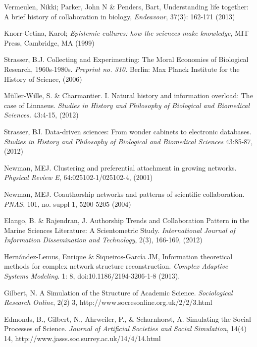 \begin{thebibliography}{50}

 Vermeulen, Nikki; Parker, John N \& Penders,
  Bart, Understanding life together: A brief history of collaboration
  in biology, \textit{Endeavour}, 37(3): 162-171 (2013) 

 Knorr-Cetina, Karol; \textit{Epistemic
  cultures: how the sciences make knowledge}, MIT Press, Cambridge, MA
  (1999) 

 Strasser, B.J. Collecting and Experimenting:
  The Moral Economies of Biological Research, 1960s-1980s.
  \textit{Preprint no. 310.} Berlin: Max Planck Institute for the
  History of Science, (2006) 

 M\"{u}ller-Wille, S. \& Charmantier. I.  Natural
  history and information overload: The case of Linnaeus.
  \textit{Studies in History and Philosophy of Biological and
    Biomedical Sciences.} 43:4-15, (2012) 

 Strasser, BJ. Data-driven sciences: From
  wonder cabinets to electronic databases. \textit{Studies in History
    and Philosophy of Biological and Biomedical Sciences} 43:85-87,
  (2012) 

 Newman, MEJ. Clustering and preferential
  attachment in growing networks. \textit{Physical Review E},
  64:025102-1/025102-4, (2001) 

 Newman, MEJ. Coauthorship networks and patterns
  of scientific collaboration. \textit{PNAS}, 101, no. suppl 1,
  5200-5205 (2004) 

 Elango, B. \& Rajendran, J. Authorship Trends and
  Collaboration Pattern in the Marine Sciences Literature: A
  Scientometric Study. \textit{International Journal of Information
    Dissemination and Technology}, 2(3), 166-169, (2012)
  
  
 Hern\'andez-Lemus, Enrique \&
  Siqueiros-Garc\'ia JM, Information theoretical methods for complex
  network structure reconstruction. \textit{Complex Adaptive Systems
    Modeling}. 1: 8, doi:10.1186/2194-3206-1-8 (2013).

 Gilbert, N. A Simulation of the Structure of
  Academic Science. \textit{Sociological Research Online}, 2(2) 3,
  http://www.socresonline.org.uk/2/2/3.html 
  
 Edmonds, B., Gilbert, N., Ahrweiler, P., \&
  Scharnhorst, A. Simulating the Social Processes of Science.
  \textit{Journal of Artificial Societies and Social Simulation},
  14(4) 14,  http://www.jasss.soc.surrey.ac.uk/14/4/14.html
  

\end{thebibliography}
